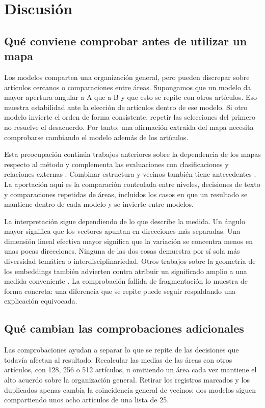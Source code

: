 \documentclass[12pt]{article}
\begin{document}
\FloatBarrier
\section{Discusión}
\subsection{Qué conviene comprobar antes de utilizar un mapa}
Los modelos comparten una organización general, pero pueden discrepar sobre artículos cercanos o comparaciones entre áreas. Supongamos que un modelo da mayor apertura angular a A que a B y que esto se repite con otros artículos. Eso muestra estabilidad ante la elección de artículos dentro de ese modelo. Si otro modelo invierte el orden de forma consistente, repetir las selecciones del primero no resuelve el desacuerdo. Por tanto, una afirmación extraída del mapa necesita comprobarse cambiando el modelo además de los artículos.

Esta preocupación continúa trabajos anteriores sobre la dependencia de los mapas respecto al método \citep{refa0d2d707e6,ref6a2f5912bc} y complementa las evaluaciones con clasificaciones y relaciones externas \citep{refbe130e2973,refc0e2cc29e0}. Combinar estructura y vecinos también tiene antecedentes \citep{ref4e1e0d5582}. La aportación aquí es la comparación controlada entre niveles, decisiones de texto y comparaciones repetidas de áreas, incluidos los casos en que un resultado se mantiene dentro de cada modelo y se invierte entre modelos.

La interpretación sigue dependiendo de lo que describe la medida. Un ángulo mayor significa que los vectores apuntan en direcciones más separadas. Una dimensión lineal efectiva mayor significa que la variación se concentra menos en unas pocas direcciones. Ninguna de las dos cosas demuestra por sí sola más diversidad temática o interdisciplinariedad. Otros trabajos sobre la geometría de los embeddings también advierten contra atribuir un significado amplio a una medida conveniente \citep{rudman-etal-2022-isoscore}. La comprobación fallida de fragmentación lo muestra de forma concreta: una diferencia que se repite puede seguir respaldando una explicación equivocada.

\subsection{Qué cambian las comprobaciones adicionales}
Las comprobaciones ayudan a separar lo que se repite de las decisiones que todavía afectan al resultado. Recalcular las medias de las áreas con otros artículos, con 128, 256 o 512 artículos, u omitiendo un área cada vez mantiene el alto acuerdo sobre la organización general. Retirar los registros marcados y los duplicados apenas cambia la coincidencia general de vecinos: dos modelos siguen compartiendo unos ocho artículos de una lista de 25.
\end{document}
